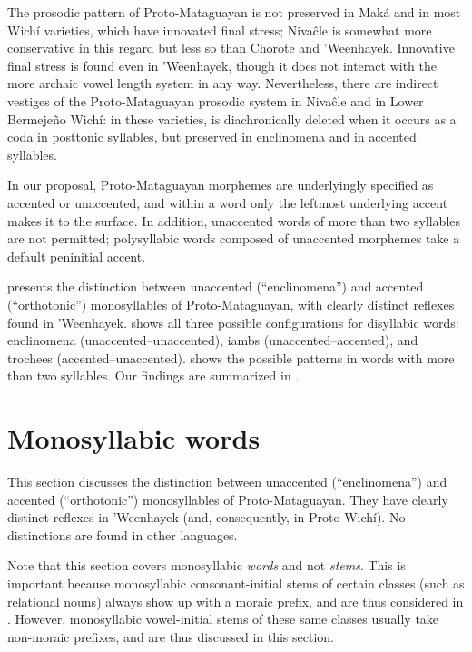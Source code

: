 The prosodic pattern of Proto-Mataguayan is not preserved in Maká and in most Wichí varieties, which have innovated final stress; Nivaĉle is somewhat more conservative in this regard but less so than Chorote and ’Weenhayek. Innovative final stress is found even in ’Weenhayek, though it does not interact with the more archaic vowel length system in any way. Nevertheless, there are indirect vestiges of the Proto-Mataguayan prosodic system in Nivaĉle and in Lower Bermejeño Wichí: in these varieties,  is diachronically deleted when it occurs as a coda in posttonic syllables, but preserved in enclinomena and in accented syllables.

In our proposal, Proto-Mataguayan morphemes are underlyingly specified as accented or unaccented, and within a word only the leftmost underlying accent makes it to the surface. In addition, unaccented words of more than two syllables are not permitted; polysyllabic words composed of unaccented morphemes take a default peninitial accent.

 presents the distinction between unaccented (``enclinomena'') and accented (``orthotonic'') monosyllables of Proto-Mataguayan, with clearly distinct reflexes found in ’Weenhayek.  shows all three possible configurations for disyllabic words: enclinomena (unaccented--unaccented), iambs (unaccented--accented), and trochees (accented--unaccented).  shows the possible patterns in words with more than two syllables. Our findings are summarized in .

\section{Monosyllabic words} \label{monosyllabic}
This section discusses the distinction between unaccented (``enclinomena'') and accented (``orthotonic'') monosyllables of Proto-Mataguayan. They have clearly distinct reflexes in ’Weenhayek (and, consequently, in Proto-Wichí). No distinctions are found in other languages.

Note that this section covers monosyllabic \emph{words} and not \emph{stems}. This is important because monosyllabic consonant-initial stems of certain classes (such as relational nouns) always show up with a moraic prefix, and are thus considered in . However, monosyllabic vowel-initial stems of these same classes usually take non-moraic prefixes, and are thus discussed in this section.

